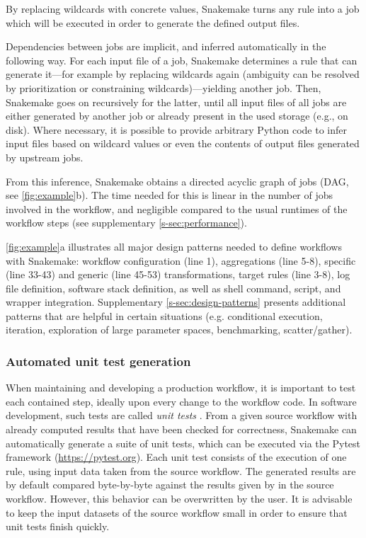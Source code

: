 \documentclass[10pt,a4paper,twocolumn]{article}
\let\plainurl\url
\renewcommand{\url}[1]{\protect\plainurl{#1}}
\begin{document}
By replacing wildcards with concrete values, Snakemake turns any rule into a job which will be executed in order to generate the defined output files.

Dependencies between jobs are implicit, and inferred automatically in the following way.
For each input file of a job, Snakemake determines a rule that can generate it---for example by replacing wildcards again (ambiguity can be resolved by prioritization or constraining wildcards)---yielding another job.
Then, Snakemake goes on recursively for the latter, until all input files of all jobs are either generated by another job or already present in the used storage (e.g., on disk).
Where necessary, it is possible to provide arbitrary Python code to infer input files based on wildcard values or even the contents of output files generated by upstream jobs.

From this inference, Snakemake obtains a directed acyclic graph of jobs (DAG, see \autoref{fig:example}b).
The time needed for this is linear in the number of jobs involved in the workflow, and negligible compared to the usual runtimes of the workflow steps (see supplementary \autoref{s-sec:performance}).

\autoref{fig:example}a illustrates all major design patterns needed to define workflows with Snakemake: workflow configuration (line 1), aggregations (line 5-8), specific (line 33-43) and generic (line 45-53) transformations, target rules (line 3-8), log file definition, software stack definition, as well as shell command, script, and wrapper integration.
Supplementary \autoref{s-sec:design-patterns} presents additional patterns that are helpful in certain situations (e.g. conditional execution, iteration, exploration of large parameter spaces, benchmarking, scatter/gather).

\subsubsection{Automated unit test generation}

When maintaining and developing a production workflow, it is important to test each contained step, ideally upon every change to the workflow code.
In software development, such tests are called \emph{unit tests} \cite{huizinga_automated_2007}.
From a given source workflow with already computed results that have been checked for correctness, Snakemake can automatically generate a suite of unit tests, which can be executed via the Pytest framework (\url{https://pytest.org}).
Each unit test consists of the execution of one rule, using input data taken from the source workflow.
The generated results are by default compared byte-by-byte against the results given by in the source workflow.
However, this behavior can be overwritten by the user.
It is advisable to keep the input datasets of the source workflow small in order to ensure that unit tests finish quickly.
\end{document}
